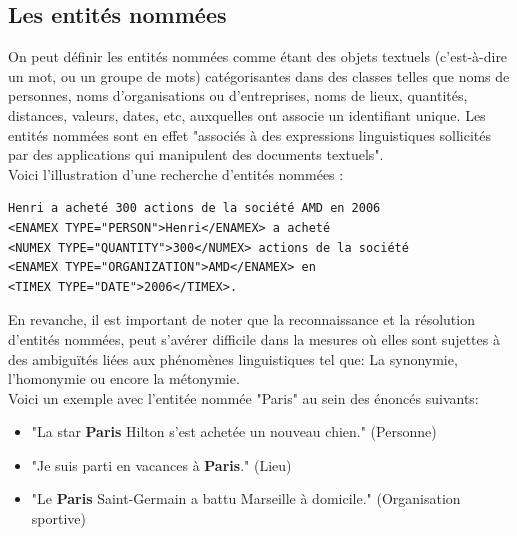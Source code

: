 \documentclass[a4paper, 11pt]{report}
\begin{document}
\subsection{Les entités nommées}
On peut définir les entités nommées comme étant des objets textuels (c'est-à-dire un mot, ou un groupe de mots) catégorisantes dans des classes telles que noms de personnes, noms d'organisations ou d'entreprises, noms de lieux, quantités, distances, valeurs, dates, etc, auxquelles ont associe un identifiant unique. Les entités nommées sont en effet "associés à des expressions linguistiques sollicités par des applications qui manipulent des documents textuels".\\Voici l'illustration d'une recherche d'entités nommées :
\begin{verbatim}
Henri a acheté 300 actions de la société AMD en 2006
<ENAMEX TYPE="PERSON">Henri</ENAMEX> a acheté 
<NUMEX TYPE="QUANTITY">300</NUMEX> actions de la société 
<ENAMEX TYPE="ORGANIZATION">AMD</ENAMEX> en 
<TIMEX TYPE="DATE">2006</TIMEX>.
\end{verbatim}
En revanche, il est important de noter que la reconnaissance et la résolution d'entités nommées, peut s'avérer difficile dans la mesures où elles sont sujettes à des ambiguïtés liées aux phénomènes linguistiques tel que: La synonymie, l'homonymie ou encore la métonymie.\\
Voici un exemple avec l'entitée nommée "Paris" au sein des énoncés suivants:
\begin{itemize}
\item "La star \textbf{Paris} Hilton s'est achetée un nouveau chien." (Personne)
\item "Je suis parti en vacances à \textbf{Paris}." (Lieu)
\item "Le \textbf{Paris} Saint-Germain a battu Marseille à domicile." (Organisation sportive)
\end{itemize}
\end{document}
